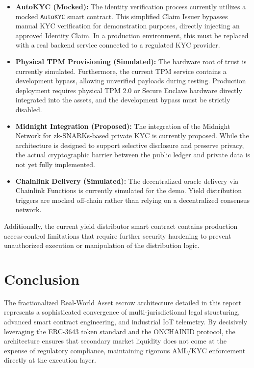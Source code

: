 \documentclass{Resources/bdlt-project}
\begin{document}
\begin{itemize}
    \item \textbf{AutoKYC (Mocked):} The identity verification process currently utilizes a mocked \texttt{AutoKYC} smart contract. This simplified Claim Issuer bypasses manual KYC verification for demonstration purposes, directly injecting an approved Identity Claim. In a production environment, this must be replaced with a real backend service connected to a regulated KYC provider.
    \item \textbf{Physical TPM Provisioning (Simulated):} The hardware root of trust is currently simulated. Furthermore, the current TPM service contains a development bypass, allowing unverified payloads during testing. Production deployment requires physical TPM 2.0 or Secure Enclave hardware directly integrated into the assets, and the development bypass must be strictly disabled.
    \item \textbf{Midnight Integration (Proposed):} The integration of the Midnight Network for zk-SNARKs-based private KYC is currently proposed. While the architecture is designed to support selective disclosure and preserve privacy, the actual cryptographic barrier between the public ledger and private data is not yet fully implemented.
    \item \textbf{Chainlink Delivery (Simulated):} The decentralized oracle delivery via Chainlink Functions is currently simulated for the demo. Yield distribution triggers are mocked off-chain rather than relying on a decentralized consensus network.
\end{itemize}

Additionally, the current yield distributor smart contract contains production access-control limitations that require further security hardening to prevent unauthorized execution or manipulation of the distribution logic.

\section{Conclusion}
The fractionalized Real-World Asset escrow architecture detailed in this report represents a sophisticated convergence of multi-jurisdictional legal structuring, advanced smart contract engineering, and industrial IoT telemetry. By decisively leveraging the ERC-3643 token standard and the ONCHAINID protocol, the architecture ensures that secondary market liquidity does not come at the expense of regulatory compliance, maintaining rigorous AML/KYC enforcement directly at the execution layer.
\end{document}

